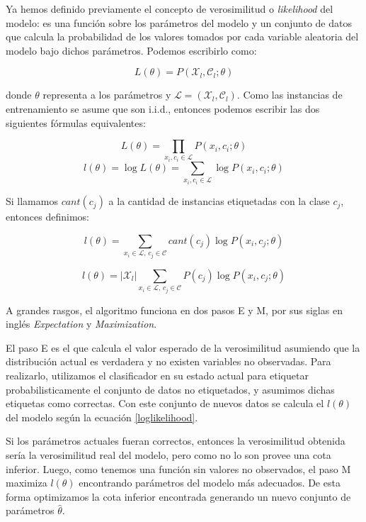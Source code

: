 Ya hemos definido previamente el concepto de verosimilitud o \textit{likelihood} del modelo: es una función sobre los parámetros del modelo y un conjunto de datos que calcula la probabilidad de los valores tomados por cada variable aleatoria del modelo bajo dichos parámetros. Podemos escribirlo como:

\begin{equation}
L(\theta) = P(\mathcal{X}_l, \mathcal{C}_l; \theta)
\end{equation}

donde $\theta$ representa a los parámetros y $\mathcal{L} = (\mathcal{X}_l, \mathcal{C}_l)$. Como las instancias de entrenamiento se asume que son i.i.d., entonces podemos escribir las dos siguientes fórmulas equivalentes:

\begin{equation}
L(\theta) = \prod_{x_i, c_i \in \mathcal{L}} P(x_i, c_i; \theta)
\end{equation}
\begin{equation}
l(\theta) = \log L(\theta) = \sum_{x_i, c_i \in \mathcal{L}} \log P(x_i, c_i; \theta)
\end{equation}

Si llamamos $cant(c_j)$ a la cantidad de instancias etiquetadas con la clase $c_j$, entonces definimos:

\begin{equation}
l(\theta) = \sum_{x_i \in \mathcal{L}, \, c_j \in \mathcal{C}} cant(c_j) \log P(x_i, c_j; \theta)
\end{equation}

\begin{equation}\label{loglikelihood}
l(\theta) = |\mathcal{X}_l| \sum_{x_i \in \mathcal{L}, \, c_j \in \mathcal{C}} P(c_j) \log P(x_i, c_j; \theta)
\end{equation}


A grandes rasgos, el algoritmo funciona en dos pasos E y M, por sus siglas en inglés \textit{Expectation} y \textit{Maximization}.

El paso E es el que calcula el valor esperado de la verosimilitud asumiendo que la distribución actual es verdadera y no existen variables no observadas. Para realizarlo, utilizamos el clasificador en su estado actual para etiquetar probabilisticamente el conjunto de datos no etiquetados, y asumimos dichas etiquetas como correctas. Con este conjunto de nuevos datos se calcula el $l(\theta)$ del modelo según la ecuación \ref{loglikelihood}.

Si los parámetros actuales fueran correctos, entonces la verosimilitud obtenida sería la verosimilitud real del modelo, pero como no lo son provee una cota inferior. Luego, como tenemos una función sin valores no observados, el paso M maximiza $l(\theta)$ encontrando parámetros del modelo más adecuados. De esta forma optimizamos la cota inferior encontrada generando un nuevo conjunto de parámetros $\hat{\theta}$.

